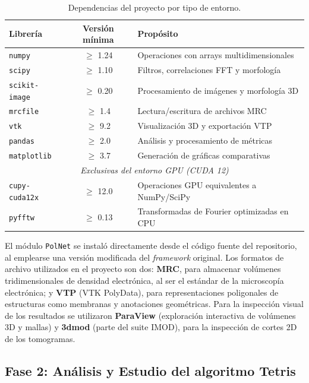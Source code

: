 \begin{table}[H]
\centering
\begin{tabular}{|l|c|l|}
\hline
\textbf{Librería} & \textbf{Versión mínima} & \textbf{Propósito} \\
\hline
\texttt{numpy} & $\geq$ 1.24 & Operaciones con arrays multidimensionales \\
\texttt{scipy} & $\geq$ 1.10 & Filtros, correlaciones FFT y morfología \\
\texttt{scikit-image} & $\geq$ 0.20 & Procesamiento de imágenes y morfología 3D \\
\texttt{mrcfile} & $\geq$ 1.4 & Lectura/escritura de archivos MRC \\
\texttt{vtk} & $\geq$ 9.2 & Visualización 3D y exportación VTP \\
\texttt{pandas} & $\geq$ 2.0 & Análisis y procesamiento de métricas \\
\texttt{matplotlib} & $\geq$ 3.7 & Generación de gráficas comparativas \\
\hline
\multicolumn{3}{|c|}{\textit{Exclusivas del entorno GPU (CUDA 12)}} \\
\hline
\texttt{cupy-cuda12x} & $\geq$ 12.0 & Operaciones GPU equivalentes a NumPy/SciPy \\
\texttt{pyfftw} & $\geq$ 0.13 & Transformadas de Fourier optimizadas en CPU \\
\hline
\end{tabular}
\caption{Dependencias del proyecto por tipo de entorno.}
\label{tab:dependencias}
\end{table}

El módulo \texttt{PolNet} se instaló directamente desde el código fuente del repositorio, al emplearse una versión modificada del \textit{framework} original. Los formatos de archivo utilizados en el proyecto son dos: \textbf{MRC}, para almacenar volúmenes tridimensionales de densidad electrónica, al ser el estándar de la microscopía electrónica; y \textbf{VTP} (VTK PolyData), para representaciones poligonales de estructuras como membranas y anotaciones geométricas. Para la inspección visual de los resultados se utilizaron \textbf{ParaView} (exploración interactiva de volúmenes 3D y mallas) y \textbf{3dmod} (parte del suite IMOD), para la inspección de cortes 2D de los tomogramas.


\subsection{Fase 2: Análisis y Estudio del algoritmo Tetris}

